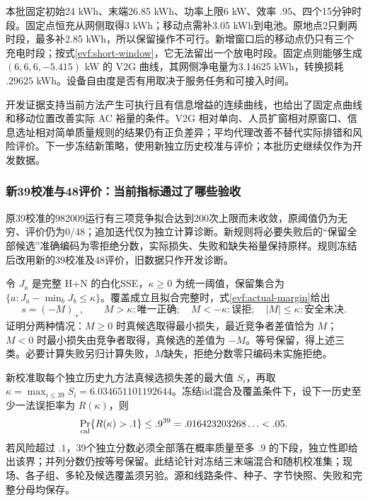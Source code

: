 \documentclass[UTF8,fontset=fandol,11pt,a4paper]{ctexart}
\begin{document}
本批固定初始24 kWh、末端26.85 kWh、功率上限6 kW、效率 $.95$、四个15分钟时段。固定点恒充从网侧取得3 kWh；移动点需补3.05 kWh到电池。原地点2只剩两时段，最多补2.85 kWh，所以保留操作不可行。新增窗口后的移动点仍只有三个充电时段；按式\eqref{evf:short-window}，它无法留出一个放电时段。固定点则能够生成 $(6,6,6,-5.415)$ kW 的 V2G 曲线，其网侧净电量为3.14625 kWh，转换损耗 $.29625$ kWh。设备自由度是否有用取决于服务任务和可接入时间。

开发证据支持当前方法产生可执行且有信息增益的连续曲线，也给出了固定点曲线和移动位置改善实际 AC 裕量的条件。V2G 相对单向、人员扩窗相对原窗口、信息选址相对简单质量规则的结果仍有正负差异；平均代理改善不替代实际排错和风险评价。下一步冻结新策略，使用新独立历史校准与评价；本批历史继续仅作为开发数据。

\subsubsection{新39校准与48评价：当前指标通过了哪些验收}
原39校准的982009运行有三项竞争拟合达到200次上限而未收敛，原阈值仍为无穷、评价仍为0/48；追加迭代仅为独立计算诊断。新规则将必要失败后的“保留全部候选”准确编码为零拒绝分数，实际损失、失败和缺失裕量保持原样。规则冻结后改用新的39校准及48评价，旧数据只作开发诊断。

令 $J_a$ 是完整 H+N 的白化SSE，$\kappa\ge0$ 为统一阈值，保留集合为 $\{a:J_a-\min_bJ_b\le\kappa\}$。覆盖成立且拟合完整时，式\eqref{evf:actual-margin}给出
\begin{equation}
 \boxed{s=(-M)_+,\qquad
 M>\kappa:\text{唯一正确};\quad M<-\kappa:\text{误拒};\quad
 |M|\le\kappa:\text{安全未决}.}
 \label{evf:calibrated-margin}
\end{equation}
证明分两种情况：$M\ge0$ 时真候选取得最小损失，最近竞争者差值恰为 $M$；$M<0$ 时最小损失由竞争者取得，真候选的差值为 $-M$。等号保留，得上述三类。必要计算失败另归计算失败，$M$缺失，拒绝分数零只编码未实施拒绝。

新校准取每个独立历史九方法真候选损失差的最大值 $S_i$，再取 $\kappa=\max_{i\le39}S_i=6.034651101192644$。冻结iid混合及覆盖条件下，设下一历史至少一法误拒率为 $R(\kappa)$，则
\begin{equation}
 \Pr_{\rm cal}\{R(\kappa)>.1\}\le.9^{39}=.016423203268\ldots<.05.
 \label{evf:tolerance}
\end{equation}
若风险超过 $.1$，39个独立分数必须全部落在概率质量至多 $.9$ 的下段，独立性即给出该界；并列分数仍按等号保留。此结论针对冻结三末端混合和随机校准集；现场、各子组、多轮及候选覆盖须另验。源和线路条件、种子、字节快照、失败和完整分母均保存。
\end{document}
